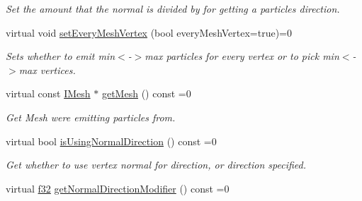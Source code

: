 \begin{DoxyCompactItemize}
\begin{DoxyCompactList}\small\item\em Set the amount that the normal is divided by for getting a particles direction. \end{DoxyCompactList}\item 
\mbox{\label{classirr_1_1scene_1_1IParticleMeshEmitter_a1afad351c4d456ad61340f64afa1b7ae}} 
virtual void \hyperlink{classirr_1_1scene_1_1IParticleMeshEmitter_a1afad351c4d456ad61340f64afa1b7ae}{set\+Every\+Mesh\+Vertex} (bool every\+Mesh\+Vertex=true)=0
\begin{DoxyCompactList}\small\item\em Sets whether to emit min$<$-\/$>$max particles for every vertex or to pick min$<$-\/$>$max vertices. \end{DoxyCompactList}\item 
\mbox{\label{classirr_1_1scene_1_1IParticleMeshEmitter_aedecba70f370878c757a1c95cfde52e9}} 
virtual const \hyperlink{classirr_1_1scene_1_1IMesh}{I\+Mesh} $\ast$ \hyperlink{classirr_1_1scene_1_1IParticleMeshEmitter_aedecba70f370878c757a1c95cfde52e9}{get\+Mesh} () const =0
\begin{DoxyCompactList}\small\item\em Get Mesh we\textquotesingle{}re emitting particles from. \end{DoxyCompactList}\item 
\mbox{\label{classirr_1_1scene_1_1IParticleMeshEmitter_a23d866a4cbfab5a3f7ab55636516d1e2}} 
virtual bool \hyperlink{classirr_1_1scene_1_1IParticleMeshEmitter_a23d866a4cbfab5a3f7ab55636516d1e2}{is\+Using\+Normal\+Direction} () const =0
\begin{DoxyCompactList}\small\item\em Get whether to use vertex normal for direction, or direction specified. \end{DoxyCompactList}\item 
\mbox{\label{classirr_1_1scene_1_1IParticleMeshEmitter_aded144f185ab40a4b45371e3686e802b}} 
virtual \hyperlink{namespaceirr_a0277be98d67dc26ff93b1a6a1d086b07}{f32} \hyperlink{classirr_1_1scene_1_1IParticleMeshEmitter_aded144f185ab40a4b45371e3686e802b}{get\+Normal\+Direction\+Modifier} () const =0

\end{DoxyCompactItemize}
